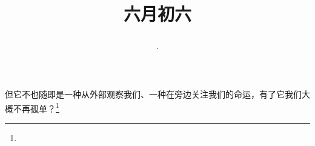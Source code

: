 \title{\date[d=11,m=7,y=2024][year:cn-y,年,month:cn,day:cn,日,·,weekday]·六月初六 }
但它不也随即是一种从外部观察我们、一种在旁边关注我们的命运，有了它我们大概不再孤单？\footnote{ }

